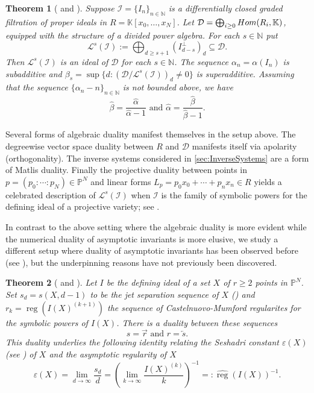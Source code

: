 \documentclass[12pt, reqno]{amsart}
\numberwithin{equation}{section}
\def\e{\ensuremath{\varepsilon}}
\newcommand{\wa}{\widehat{\alpha}}
\newcommand{\wb}{\widehat{\beta}}
\newcommand{\N}{{\mathbb N}}
\renewcommand{\P}{{\mathbb P}}
\newcommand{\kk}{\mathbb{K}}
\newcommand{\cI}{{\mathcal I}}
\newcommand{\I}{{\mathcal I}}
\renewcommand{\L}{{\mathcal L}}
\DeclareMathOperator{\reg}{reg}
\theoremstyle{plain} %
\newtheorem*{introthm*}{Theorem}
\theoremstyle{definition}
\theoremstyle{remark}
\newcommand{\so}{\overleftarrow{s}}
\renewcommand{\L}{\mathcal{L}}
\begin{document}
\begin{introthm*}[ and ]
Suppose $\I=\{I_n\}_{n\in\N}$ is a differentially closed graded filtration of proper ideals in $R=\kk[x_0,\ldots,x_N]$.  Let  $\mathcal{D}=\bigoplus_{i\geq 0} {\rm Hom}(R_i,\kk)$, equipped with the structure of a divided power algebra.  For each $s\in\N$ put 
\[
\L^s(\cI):=\bigoplus_{d\ge s+1} \left(I_{d-s}^{\perp}\right)_d \subseteq \mathcal{D}.
\]
Then $\L^s(\cI)$ is an ideal of $\mathcal{D}$ for each $s\in\N$.  The sequence $\alpha_n = \alpha(I_n)$ is subadditive and $\beta_s=\sup\{d:(\mathcal{D}/\L^s(\I))_d\neq 0\}$ is superadditive.  Assuming that the sequence $\{\alpha_n-n\}_{n\in\N}$ is not bounded above, we have
\[
\wb=\frac{\wa}{\wa-1} \mbox{  and  } \wa=\frac{\wb}{\wb-1}.
\]
\end{introthm*}

Several forms of algebraic duality manifest themselves in the setup above. The degreewise vector space duality between $R$ and $\mathcal{D}$ manifests itself via apolarity (orthogonality). The inverse systems considered in  \cref{sec:InverseSystems} are a form of Matlis duality. Finally the projective duality between points in $p=(p_0:\cdots:p_N)\in \P^N$ and linear forms $L_p=p_0x_0+\cdots+p_nx_n\in R$ yields a celebrated description of $\L^s(\cI)$  when $\mathcal{I}$ is the family of symbolic powers for the defining ideal of a projective variety; see .

In contrast to the above setting where the algebraic duality is more evident while the numerical duality of asymptotic invariants is more elusive, we study a different setup where duality of asymptotic invariants has been observed before (see \cite[\S 5.1]{Laz04}), but the underpinning reasons have not previously been discovered. 

\begin{introthm*}[ and ]
Let $I$ be the defining ideal of a set $X$ of $r\geq 2$  points in $\P^N$. Set $s_d=s(X,d-1)$ to be the jet separation sequence of $X$ () and $r_k=\reg(I(X)^{(k+1)})$ the sequence of Castelnuovo-Mumford regularites for the symbolic powers of $I(X)$. There is a duality between these sequences
\[
 s=\overrightarrow{r} \text{ and } r=\so.
\]
This duality underlies the following identity relating the Seshadri constant $\e(X)$ (see ) of $X$ and the asymptotic regularity of $X$
\[
\e(X)=\lim_{d\to\infty}\frac{s_d}{d}= \left(\lim_{k\to\infty}\frac{I(X)^{(k)}}{k}\right)^{-1}= :\widehat{\reg}(I(X))^{-1}.
\]
\end{introthm*}
\end{document}
